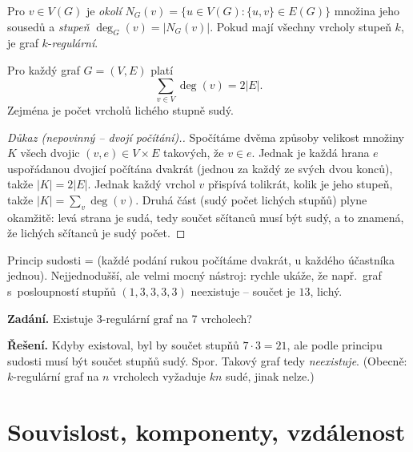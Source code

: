 \documentclass[11pt,a4paper]{article}
\begin{document}
\begin{definice}
Pro $v\in V(G)$ je \emph{okolí} $N_G(v)=\{u\in V(G):\{u,v\}\in E(G)\}$ množina jeho sousedů a \emph{stupeň} $\deg_G(v)=|N_G(v)|$. Pokud mají všechny vrcholy stupeň $k$, je graf $k$-\emph{regulární}.
\end{definice}

\begin{veta}
Pro každý graf $G=(V,E)$ platí
\[ \sum_{v\in V}\deg(v)=2|E|. \]
Zejména je počet vrcholů lichého stupně sudý.
\end{veta}

\begin{proof}[Důkaz \textnormal{(nepovinný -- dvojí počítání).}]
Spočítáme dvěma způsoby velikost množiny $K$ všech dvojic $(v,e)\in V\times E$ takových, že $v\in e$. Jednak je každá hrana $e$ uspořádanou dvojicí počítána dvakrát (jednou za každý ze svých dvou konců), takže $|K|=2|E|$. Jednak každý vrchol $v$ přispívá tolikrát, kolik je jeho stupeň, takže $|K|=\sum_v\deg(v)$. Druhá část (sudý počet lichých stupňů) plyne okamžitě: levá strana je sudá, tedy součet  sčítanců musí být sudý, a to znamená, že lichých sčítanců je sudý počet.
\end{proof}

\begin{intuice}
Princip sudosti =  (každé podání rukou počítáme dvakrát, u každého účastníka jednou). Nejjednodušší, ale velmi mocný nástroj: rychle ukáže, že např.\ graf s~posloupností stupňů $(1,3,3,3,3)$ neexistuje -- součet je $13$, lichý.
\end{intuice}

\begin{priklad}
\textbf{Zadání.} Existuje 3-regulární graf na 7 vrcholech?

\textbf{Řešení.} Kdyby existoval, byl by součet stupňů $7\cdot 3=21$, ale podle principu sudosti musí být součet stupňů sudý. Spor. Takový graf tedy \emph{neexistuje}. (Obecně: $k$-regulární graf na $n$ vrcholech vyžaduje $kn$ sudé, jinak nelze.)
\end{priklad}

\section{Souvislost, komponenty, vzdálenost}
\end{document}
